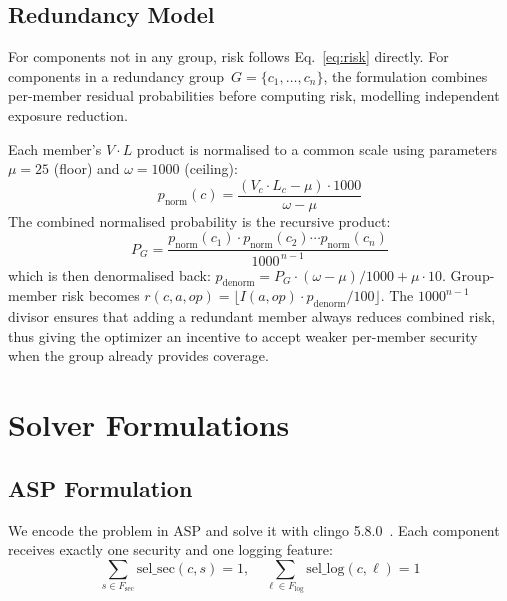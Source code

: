 \documentclass[conference]{IEEEtran}
\begin{document}
\subsection{Redundancy Model}
\label{sec:redun}

For components not in any group, risk follows Eq.~\ref{eq:risk}
directly. For components in a redundancy group~$G = \{c_1, \ldots,
c_n\}$, the formulation combines per-member residual probabilities
before computing risk, modelling independent exposure reduction.

Each member's $V \cdot L$ product is normalised to a common scale
using parameters $\mu\!=\!25$ (floor) and $\omega\!=\!1000$ (ceiling):
\begin{equation}
p_{\text{norm}}(c) = \frac{(V_c \cdot L_c - \mu) \cdot 1000}{\omega - \mu}
\label{eq:norm}
\end{equation}
The combined normalised probability is the recursive product:
\begin{equation}
P_G = \frac{p_{\text{norm}}(c_1) \cdot p_{\text{norm}}(c_2) \cdots p_{\text{norm}}(c_n)}{1000^{\,n-1}}
\label{eq:combine}
\end{equation}
which is then denormalised back:
$p_{\text{denorm}} = P_G \cdot (\omega - \mu) / 1000 + \mu \cdot 10$.
Group-member risk becomes
$r(c,a,op) = \lfloor I(a,op) \cdot p_{\text{denorm}} / 100 \rfloor$.
The $1000^{n-1}$ divisor ensures that adding a redundant member always
reduces combined risk, thus giving the optimizer an incentive to accept
weaker per-member security when the group already provides coverage.

\section{Solver Formulations}

\subsection{ASP Formulation}

We encode the problem in ASP and solve it with clingo
5.8.0~\cite{gebser_potassco_2011}. Each component receives exactly one
security and one logging feature:
\begin{equation}
\sum_{s \in F_{\text{sec}}} \text{sel\_sec}(c,s)=1,\quad
\sum_{\ell \in F_{\text{log}}} \text{sel\_log}(c,\ell)=1
\end{equation}
\end{document}
